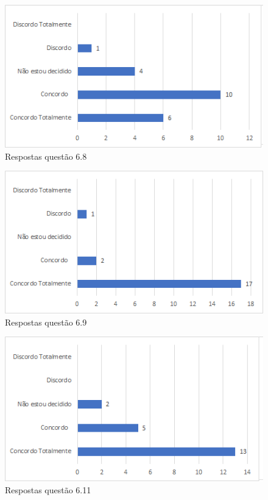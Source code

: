 \begin{figure}[!t]
\centering
\includegraphics[scale=0.7]{figuras das questoes/6.8.png}
\caption{Respostas questão 6.8}
\end{figure}

\begin{figure}[!t]
\centering
\includegraphics[scale=0.7]{figuras das questoes/6.9.png}
\caption{Respostas questão 6.9}
\end{figure}

\begin{figure}[!t]
\centering
\includegraphics[scale=0.7]{figuras das questoes/6.10.png}
\caption{Respostas questão 6.11}
\end{figure}


